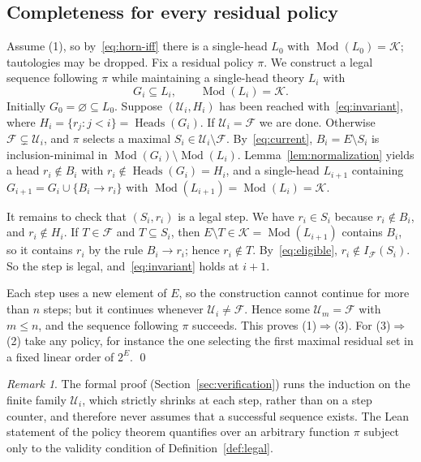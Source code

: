 \documentclass[11pt,a4paper]{article}
\theoremstyle{plain}
\theoremstyle{definition}
\theoremstyle{remark}
\newtheorem{remark}[theorem]{Remark}
\newcommand{\cF}{\mathcal F}
\newcommand{\cK}{\mathcal K}
\newcommand{\cU}{\mathcal U}
\newcommand{\Mod}{\operatorname{Mod}}
\newcommand{\Heads}{\operatorname{Heads}}
\newcommand{\Int}{I_{\cF}}
\newcommand{\pw}[1]{2^{#1}}
\begin{document}
\subsection{Completeness for every residual policy}

Assume (1), so by~\eqref{eq:horn-iff} there is a single-head $L_0$ with $\Mod(L_0)=\cK$; tautologies may be dropped. Fix a residual policy $\pi$. We construct a legal sequence following $\pi$ while maintaining a single-head theory $L_i$ with
\begin{equation}\label{eq:invariant}
 G_i\subseteq L_i,\qquad \Mod(L_i)=\cK .
\end{equation}
Initially $G_0=\varnothing\subseteq L_0$. Suppose $(\cU_i,H_i)$ has been reached with~\eqref{eq:invariant}, where $H_i=\{r_j:j<i\}=\Heads(G_i)$. If $\cU_i=\cF$ we are done. Otherwise $\cF\subsetneq\cU_i$, and $\pi$ selects a maximal $S_i\in\cU_i\setminus\cF$. By~\eqref{eq:current}, $B_i=E\setminus S_i$ is inclusion-minimal in $\Mod(G_i)\setminus\Mod(L_i)$. Lemma~\ref{lem:normalization} yields a head $r_i\notin B_i$ with $r_i\notin\Heads(G_i)=H_i$, and a single-head $L_{i+1}$ containing $G_{i+1}=G_i\cup\{B_i\to r_i\}$ with $\Mod(L_{i+1})=\Mod(L_i)=\cK$.

It remains to check that $(S_i,r_i)$ is a legal step. We have $r_i\in S_i$ because $r_i\notin B_i$, and $r_i\notin H_i$. If $T\in\cF$ and $T\subseteq S_i$, then $E\setminus T\in\cK=\Mod(L_{i+1})$ contains $B_i$, so it contains $r_i$ by the rule $B_i\to r_i$; hence $r_i\notin T$. By~\eqref{eq:eligible}, $r_i\notin\Int(S_i)$. So the step is legal, and~\eqref{eq:invariant} holds at $i+1$.

Each step uses a new element of $E$, so the construction cannot continue for more than $n$ steps; but it continues whenever $\cU_i\neq\cF$. Hence some $\cU_m=\cF$ with $m\le n$, and the sequence following $\pi$ succeeds. This proves (1)$\Rightarrow$(3). For (3)$\Rightarrow$(2) take any policy, for instance the one selecting the first maximal residual set in a fixed linear order of $\pw{E}$. \qed

\begin{remark}
The formal proof (Section~\ref{sec:verification}) runs the induction on the finite family $\cU_i$, which strictly shrinks at each step, rather than on a step counter, and therefore never assumes that a successful sequence exists. The Lean statement of the policy theorem quantifies over an arbitrary function $\pi$ subject only to the validity condition of Definition~\ref{def:legal}.
\end{remark}
\end{document}
